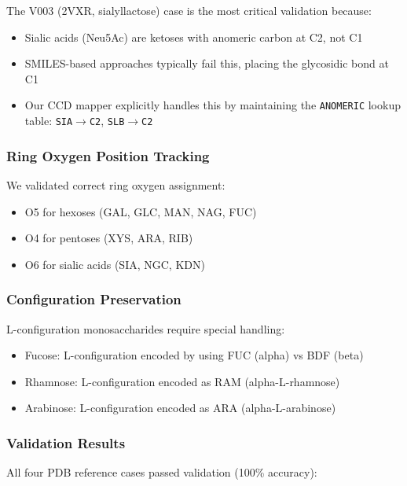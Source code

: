 The V003 (2VXR, sialyllactose) case is the most critical validation because:
\begin{itemize}
    \item Sialic acids (Neu5Ac) are ketoses with anomeric carbon at C2, not C1
    \item SMILES-based approaches typically fail this, placing the glycosidic bond at C1
    \item Our CCD mapper explicitly handles this by maintaining the \texttt{ANOMERIC} lookup table: \texttt{SIA$\rightarrow$C2}, \texttt{SLB$\rightarrow$C2}
\end{itemize}

\subsubsection{Ring Oxygen Position Tracking}

We validated correct ring oxygen assignment:
\begin{itemize}
    \item O5 for hexoses (GAL, GLC, MAN, NAG, FUC)
    \item O4 for pentoses (XYS, ARA, RIB)
    \item O6 for sialic acids (SIA, NGC, KDN)
\end{itemize}

\subsubsection{Configuration Preservation}

L-configuration monosaccharides require special handling:
\begin{itemize}
    \item Fucose: L-configuration encoded by using FUC (alpha) vs BDF (beta)
    \item Rhamnose: L-configuration encoded as RAM (alpha-L-rhamnose)
    \item Arabinose: L-configuration encoded as ARA (alpha-L-arabinose)
\end{itemize}

\subsubsection{Validation Results}

All four PDB reference cases passed validation (100\% accuracy):

